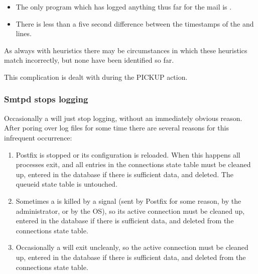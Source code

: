 \begin{itemize}

    \item The only program which has logged anything thus far for the mail
        is .

    \item There is less than a five second difference between the
        timestamps of the  and  lines.

\end{itemize}

As always with heuristics there may be circumstances in which these
heuristics match incorrectly,  but none have been identified so far.

This complication is dealt with during the PICKUP action.

\subsubsection{Smtpd stops logging}

\label{smtpd stops logging}

Occasionally a  will just stop logging, without an
immediately obvious reason.  After poring over log files for some time
there are several reasons for this infrequent occurrence:

\begin{enumerate}

    \item Postfix is stopped or its configuration is reloaded.  When this
        happens all  processes exit, and all entries in the
        connections state table must be cleaned up, entered in the database
        if there is sufficient data, and deleted.  The queueid state table
        is untouched.

    \item Sometimes a  is killed by a signal (sent by Postfix
        for some reason, by the administrator, or by the OS), so its active
        connection must be cleaned up, entered in the database if there is
        sufficient data, and deleted from the connections state table.

    \item Occasionally a  will exit uncleanly, so the active
        connection must be cleaned up, entered in the database if there is
        sufficient data, and deleted from the connections state table.

\end{enumerate}


